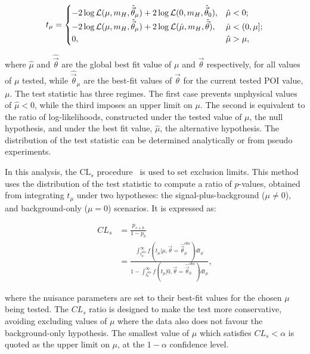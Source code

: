 \begin{equation}\label{eqn:hee_test_stat}
     t_{\mu} =
    \begin{cases}
      -2\log\mathcal{L}(\mu,m_{H},\hat{\vec{\theta}}_{\mu}) + 2\log\mathcal{L}(0,m_{H},\hat{\vec{\theta}}_{0}), & \hat{\mu}<0;\\
      -2\log\mathcal{L}(\mu,m_{H},\hat{\vec{\theta}}_{\mu}) + 2\log\mathcal{L}(\hat{\mu},m_{H},\hat{\vec{\theta}}), & \hat{\mu}<(0,\mu];\\
      0, & \hat{\mu}>\mu,\\
    \end{cases} 
\end{equation}


\noindent where $\hat{\mu}$ and $\hat{\vec{\theta}}$ are the global best fit value of $\mu$ and ${\vec{\theta}}$ respectively, for all values of $\mu$ tested, while $\hat{\vec{\theta}}_{\mu}$ are the best-fit values of $\vec{\theta}$ for the current tested POI value, $\mu$. The test statistic has three regimes. The first case prevents unphysical values of $\hat{\mu}<0$, while the third imposes an upper limit on $\mu$. The second is equivalent to the ratio of log-likelihoods, constructed under the tested value of $\mu$, the null hypothesis, and under the best fit value, $\hat{\mu}$, the alternative hypothesis. The distribution of the test statistic can be determined analytically or from pseudo experiments. %

In this analysis, the $\mathrm{CL}_s$ procedure~\cite{CLs1,CLs2,LHCStatProcedures} is used to set exclusion limits. This method uses the distribution of the test statistic to compute a ratio of $p$-values, obtained from integrating $t_{\mu}$ under two hypotheses: the signal-plus-background ($\mu\neq0$), and background-only ($\mu=0$) scenarios. It is expressed as: %

\begin{align*}
    CL_{s} &= \frac{p_{s+b}}{1-p_{b}}\\
           &= \frac{\int_{t_{\mu}^{obs}}^{\infty} f(t_{\mu}|\mu,\vec{\theta}=\hat{\vec{\theta}}_{\mu}^{obs})dt_{\mu}}{1-\int_{t_{0}^{obs}}^{\infty} f(t_{\mu}|0,\vec{\theta}=\hat{\vec{\theta}}_{0}^{obs})dt_{\mu}},
\end{align*}

\noindent where the nuisance parameters are set to their best-fit values for the chosen $\mu$ being tested. The $CL_{s}$ ratio is designed to make the test more conservative, avoiding excluding values of $\mu$ where the data also does not favour the background-only hypothesis. The smallest value of $\mu$ which satisfies $CL_{s}<\alpha$ is quoted as the upper limit on $\mu$, at the $1-\alpha$ confidence level. 

